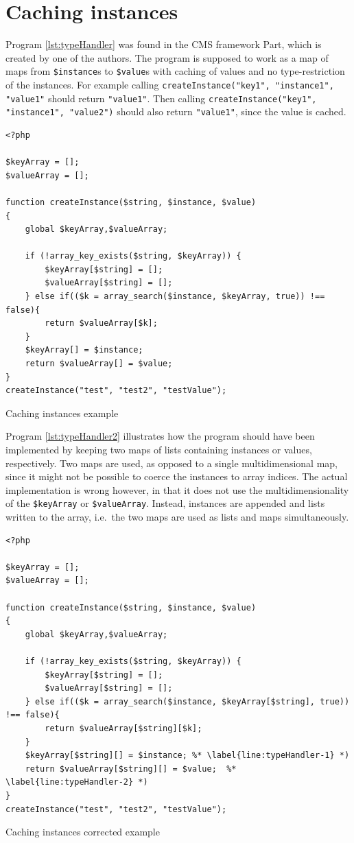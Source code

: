 \newpage
\section{Caching instances}
Program \ref{lst:typeHandler} was found in the CMS framework Part, which is created by one of the authors. The program is supposed to work as a map of maps from \texttt{\$instance}s to \texttt{\$value}s with caching of values and no type-restriction of the instances. For example calling \texttt{createInstance("key1", "instance1", "value1"}  should return \texttt{"value1"}. Then calling \texttt{createInstance("key1", "instance1", "value2")} should also return \texttt{"value1"}, since the value is cached.

\begin{program}
\begin{lstlisting}
<?php

$keyArray = [];
$valueArray = [];

function createInstance($string, $instance, $value)
{
    global $keyArray,$valueArray;

    if (!array_key_exists($string, $keyArray)) {
        $keyArray[$string] = [];
        $valueArray[$string] = [];
    } else if(($k = array_search($instance, $keyArray, true)) !== false){
        return $valueArray[$k];
    }
    $keyArray[] = $instance;
    return $valueArray[] = $value;
}
createInstance("test", "test2", "testValue");
\end{lstlisting}
\caption{Caching instances example}
\label{lst:typeHandler}
\end{program}



Program \ref{lst:typeHandler2} illustrates how the program should have been implemented by keeping two maps of lists containing instances or values, respectively. Two maps are used, as opposed to a single multidimensional map, since it might not be possible to coerce the instances to array indices. The actual implementation is wrong however, in that it does not use the multidimensionality of the \texttt{\$keyArray} or \texttt{\$valueArray}. Instead, instances are appended and lists written to the array, i.e.\ the two maps are used as lists and maps simultaneously. 



\begin{program}
\begin{lstlisting}
<?php

$keyArray = [];
$valueArray = [];

function createInstance($string, $instance, $value)
{
    global $keyArray,$valueArray;

    if (!array_key_exists($string, $keyArray)) {
        $keyArray[$string] = [];
        $valueArray[$string] = [];
    } else if(($k = array_search($instance, $keyArray[$string], true)) !== false){
        return $valueArray[$string][$k];
    }
    $keyArray[$string][] = $instance; %* \label{line:typeHandler-1} *)
    return $valueArray[$string][] = $value;  %* \label{line:typeHandler-2} *)
}
createInstance("test", "test2", "testValue");
\end{lstlisting}
\caption{Caching instances corrected example}
\label{lst:typeHandler2}
\end{program}


